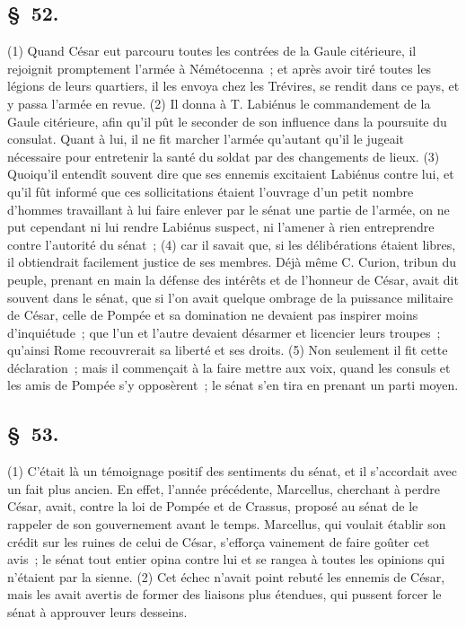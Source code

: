 \documentclass[french,twoside]{book} %
\begin{document}
\subsection[{§ 52.}]{ \textsc{§ 52.} }
\noindent (1) Quand César eut parcouru toutes les contrées de la Gaule citérieure, il rejoignit promptement l’armée à Némétocenna ; et après avoir tiré toutes les légions de leurs quartiers, il les envoya chez les Trévires, se rendit dans ce pays, et y passa l’armée en revue. (2) Il donna à T. Labiénus le commandement de la Gaule citérieure, afin qu’il pût le seconder de son influence dans la poursuite du consulat. Quant à lui, il ne fit marcher l’armée qu’autant qu’il le jugeait nécessaire pour entretenir la santé du soldat par des changements de lieux. (3) Quoiqu’il entendît souvent dire que ses ennemis excitaient Labiénus contre lui, et qu’il fût informé que ces sollicitations étaient l’ouvrage d’un petit nombre d’hommes travaillant à lui faire enlever par le sénat une partie de l’armée, on ne put cependant ni lui rendre Labiénus suspect, ni l’amener à rien entreprendre contre l’autorité du sénat ; (4) car il savait que, si les délibérations étaient libres, il obtiendrait facilement justice de ses membres. Déjà même C. Curion, tribun du peuple, prenant en main la défense des intérêts et de l’honneur de César, avait dit souvent dans le sénat, que si l’on avait quelque ombrage de la puissance militaire de César, celle de Pompée et sa domination ne devaient pas inspirer moins d’inquiétude ; que l’un et l’autre devaient désarmer et licencier leurs troupes ; qu’ainsi Rome recouvrerait sa liberté et ses droits. (5) Non seulement il fit cette déclaration ; mais il commençait à la faire mettre aux voix, quand les consuls et les amis de Pompée s’y opposèrent ; le sénat s’en tira en prenant un parti moyen.
\subsection[{§ 53.}]{ \textsc{§ 53.} }
\noindent (1) C'était là un témoignage positif des sentiments du sénat, et il s’accordait avec un fait plus ancien. En effet, l’année précédente, Marcellus, cherchant à perdre César, avait, contre la loi de Pompée et de Crassus, proposé au sénat de le rappeler de son gouvernement avant le temps. Marcellus, qui voulait établir son crédit sur les ruines de celui de César, s’efforça vainement de faire goûter cet avis ; le sénat tout entier opina contre lui et se rangea à toutes les opinions qui n’étaient par la sienne. (2) Cet échec n’avait point rebuté les ennemis de César, mais les avait avertis de former des liaisons plus étendues, qui pussent forcer le sénat à approuver leurs desseins.
\end{document}
